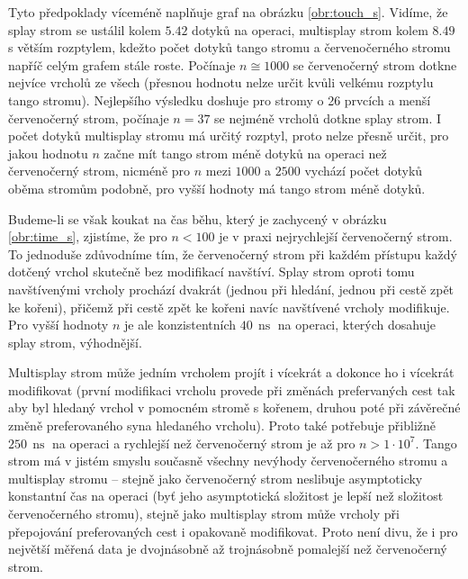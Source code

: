 
Tyto předpoklady víceméně naplňuje graf na obrázku \ref{obr:touch_s}. Vidíme,
že splay strom se ustálil kolem $5.42$ dotyků na operaci, multisplay strom
kolem $8.49$ s větším rozptylem, kdežto počet dotyků tango stromu a
červenočerného stromu napříč celým grafem stále roste. Počínaje $n\cong 1000$
se červenočerný strom dotkne nejvíce vrcholů ze všech (přesnou hodnotu nelze
určit kvůli velkému rozptylu tango stromu). Nejlepšího výsledku doshuje pro
stromy o 26 prvcích a menší červenočerný strom, počínaje $n=37$ se nejméně
vrcholů dotkne splay strom. I počet dotyků multisplay stromu má určitý rozptyl,
proto nelze přesně určit, pro jakou hodnotu $n$ začne mít tango strom méně
dotyků na operaci než červenočerný strom, nicméně pro $n$ mezi $1000$ a $2500$
vychází počet dotyků oběma stromům podobně, pro vyšší hodnoty má tango strom
méně dotyků.


Budeme-li se však koukat na čas běhu, který je zachycený v obrázku
\ref{obr:time_s}, zjistíme, že pro $n<100$ je v praxi nejrychlejší červenočerný
strom. To jednoduše zdůvodníme tím, že červenočerný strom při každém přístupu
každý dotčený vrchol skutečně bez modifikací navštíví. Splay strom oproti tomu
navštívenými vrcholy prochází dvakrát (jednou při hledání, jednou při cestě
zpět ke kořeni), přičemž při cestě zpět ke kořeni navíc navštívené vrcholy
modifikuje.  Pro vyšší hodnoty $n$ je ale konzistentních
$40\,\operatorname{ns}$ na operaci, kterých dosahuje splay strom, výhodnější.


Multisplay strom může jedním vrcholem projít i vícekrát a dokonce
ho i vícekrát modifikovat (první modifikaci vrcholu provede při změnách
prefervaných cest tak aby byl hledaný vrchol v pomocném stromě s kořenem,
druhou poté při závěrečné změně preferovaného syna hledaného vrcholu). Proto
také potřebuje přibližně $250\,\operatorname{ns}$ na operaci a rychlejší než
červenočerný strom je až pro $n>1\cdot 10^7$. Tango strom má v jistém smyslu
současně všechny nevýhody červenočerného stromu a multisplay stromu -- stejně
jako červenočerný strom neslibuje asymptoticky konstantní čas na operaci (byť
jeho asymptotická složitost je lepší než složitost červenočerného stromu),
stejně jako multisplay strom může vrcholy při přepojování preferovaných cest i
opakovaně modifikovat. Proto není divu, že i pro největší měřená data je
dvojnásobně až trojnásobně pomalejší než červenočerný strom.

